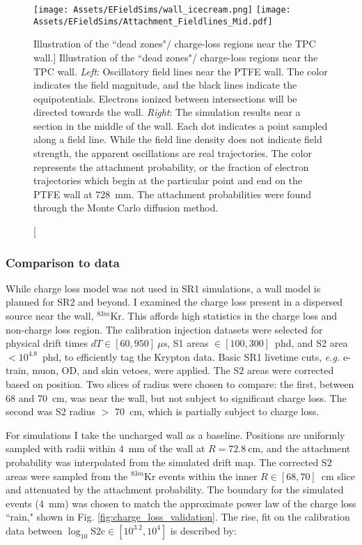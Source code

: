 \begin{figure}
    \centering
    \texttt{[image: Assets/EFieldSims/wall\_icecream.png]}
     \texttt{[image: Assets/EFieldSims/Attachment\_Fieldlines\_Mid.pdf]}
    \caption[ Illustration of the ``dead zones"/ charge-loss regions near the TPC wall.]%
    {
    Illustration of the ``dead zones"/ charge-loss regions near the TPC wall.
    \textit{Left}: Oscillatory field lines near the PTFE wall.
    The color indicates the field magnitude, and the black lines indicate the equipotentials.
    Electrons ionized between intersections will be directed towards the wall.
    \textit{Right}: The simulation results near a section in the middle of the wall. 
    Each dot indicates a point sampled along a field line.
    While the field line density does not indicate field strength, the apparent oscillations are real trajectories.
    The color represents the attachment probability, or the fraction of electron trajectories which begin at the particular point and end on the PTFE wall at 728~mm.
    The attachment probabilities were found through the Monte Carlo diffusion method.}
    \label{fig:paraview_sim_wall}
\end{figure}

\subsubsection{Comparison to data}

While charge loss model was not used in SR1 simulations, a wall model is planned for SR2 and beyond.
I examined the charge loss present in a dispersed source near the wall, $^{83m}$Kr.
This affords high statistics in the charge loss and non-charge loss region.
The calibration injection datasets were selected for physical drift times $dT \in [60, 950]~\mu \mathrm{s}$, S1 areas $\in [100, 300]$~phd, and S2 area $< 10^{4.8}$~phd, to efficiently tag the Krypton data.
Basic SR1 livetime cuts, \textit{e.g.} e-train, muon, OD, and skin vetoes, were applied.
The S2 areas were corrected based on position.
Two slices of radius were chosen to compare: the first, between 68 and 70~cm, was near the wall, but not subject to significant charge loss.
The second was S2 radius $>$ 70~cm, which  is partially subject to charge loss.

For simulations I take the uncharged wall as a baseline.
Positions are uniformly sampled with radii within 4~mm of the wall at $R=72.8\mathrm{~cm}$, and the attachment probability was interpolated from the simulated drift map.
The corrected S2 areas were sampled from the $^{83m}$Kr events within the inner $R \in [68,70]$~cm slice and attenuated by the attachment probability.
The boundary for the simulated events (4~mm) was chosen to match the approximate power law of the charge loss ``rain," shown in Fig. \ref{fig:charge_loss_validation}. 
The rise, fit on the calibration data between $\log_{10} \mathrm{S2c} \in [10^3.2, 10^4]$ is described by:

